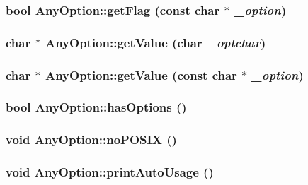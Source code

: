 \label{classAnyOption_a955d685485036fabc3cedde66f441978}
\hypertarget{classAnyOption_a4ea37ce527b713f9a6d15d3a3ea837ef}{
\subsubsection[{getFlag}]{\setlength{\rightskip}{0pt plus 5cm}bool AnyOption::getFlag (const char $\ast$ {\em \_\-option})}}
\label{classAnyOption_a4ea37ce527b713f9a6d15d3a3ea837ef}
\hypertarget{classAnyOption_ad31c09eeb4b654bd029284d910a2dab4}{
\subsubsection[{getValue}]{\setlength{\rightskip}{0pt plus 5cm}char $\ast$ AnyOption::getValue (char {\em \_\-optchar})}}
\label{classAnyOption_ad31c09eeb4b654bd029284d910a2dab4}
\hypertarget{classAnyOption_aebf849538e3a6e8b05075231bf22a609}{
\subsubsection[{getValue}]{\setlength{\rightskip}{0pt plus 5cm}char $\ast$ AnyOption::getValue (const char $\ast$ {\em \_\-option})}}
\label{classAnyOption_aebf849538e3a6e8b05075231bf22a609}
\hypertarget{classAnyOption_aefa633ab31303cbe67bc6b3b501649f4}{
\subsubsection[{hasOptions}]{\setlength{\rightskip}{0pt plus 5cm}bool AnyOption::hasOptions ()}}
\label{classAnyOption_aefa633ab31303cbe67bc6b3b501649f4}
\hypertarget{classAnyOption_aeca5328f5046690e0d381c745c1872d5}{
\subsubsection[{noPOSIX}]{\setlength{\rightskip}{0pt plus 5cm}void AnyOption::noPOSIX ()}}
\label{classAnyOption_aeca5328f5046690e0d381c745c1872d5}
\hypertarget{classAnyOption_a531b07829ead5a4a292ff2f0b3be8f9a}{
\subsubsection[{printAutoUsage}]{\setlength{\rightskip}{0pt plus 5cm}void AnyOption::printAutoUsage ()}}

